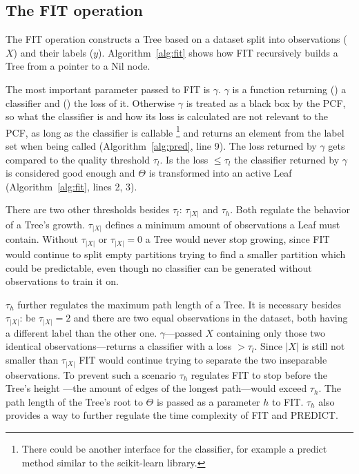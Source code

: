 \subsection{The FIT operation}
\label{subsec:fit}

The FIT operation constructs a Tree based on a dataset
split into observations ($X$) and their labels ($y$).
Algorithm~\ref{alg:fit} shows how FIT recursively builds a
Tree from a pointer to a Nil node.

The most important parameter passed to FIT is $\gamma$.
$\gamma$ is a function returning () a
classifier and () the loss of it. Otherwise
$\gamma$ is treated as a black box by the PCF, so what the
classifier is and how its loss is calculated are not
relevant to the PCF, as long as the classifier is callable%
\footnote{There could be another interface for the
  classifier, for example a predict method similar to the
  scikit-learn library.\cite{sklearn_api}}
and returns an element from the label set when being
called (Algorithm~\ref{alg:pred}, line 9). The loss
returned by $\gamma$ gets compared to the quality threshold
$\tau_l$. Is the loss $\leq \tau_l$ the classifier returned
by $\gamma$ is considered good enough and $\Theta$ is
transformed into an active Leaf (Algorithm~\ref{alg:fit},
lines 2, 3).

There are two other thresholds besides $\tau_l$:
$\tau_{|X|}$ and $\tau_h$. Both regulate the behavior of a
Tree's growth. $\tau_{|X|}$ defines a minimum amount of
observations a Leaf must contain. Without $\tau_{|X|}$ or
$\tau_{|X|} = 0$ a Tree would never stop growing, since FIT
would continue to split empty partitions trying to find a
smaller partition which could be predictable, even though
no classifier can be generated without observations to
train it on.

$\tau_h$ further regulates the maximum path length of a
Tree. It is necessary besides $\tau_{|X|}$: be
$\tau_{|X|} = 2$ and there are two equal observations in
the dataset, both having a different label than the other
one. $\gamma$---passed $X$ containing only those two
identical observations---returns a classifier with a
loss $> \tau_l$. Since $|X|$ is still not smaller than
$\tau_{|X|}$ FIT would continue trying to separate the two
inseparable observations. To prevent such a scenario
$\tau_h$ regulates FIT to stop before the Tree's height%
---the amount of edges of the longest path---would
exceed $\tau_h$. The path length of the Tree's root to
$\Theta$ is passed as a parameter $h$ to FIT. $\tau_h$ also
provides a way to further regulate the time complexity of
FIT and PREDICT.

